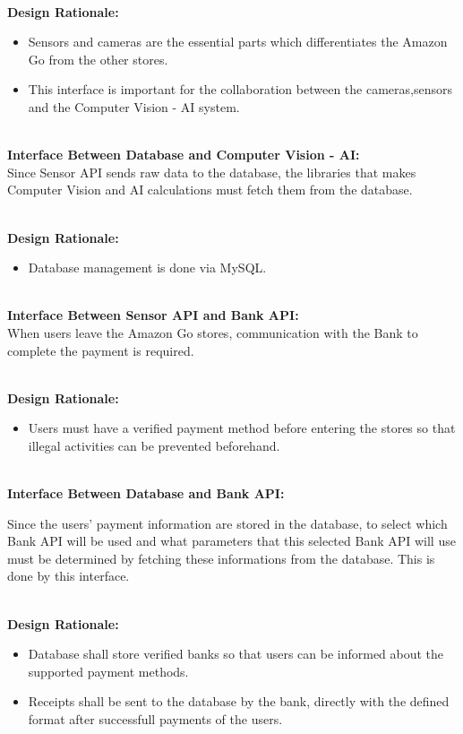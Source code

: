 \documentclass[11pt]{article}
\begin{document}
    \textbf{\\Design Rationale:}
    \begin{itemize}
        \item Sensors and cameras are the essential parts which differentiates the Amazon Go from the other stores.  
        \item This interface is important for the collaboration between the cameras,sensors and the Computer Vision - AI system.
    \end{itemize}

    \textbf{\\Interface Between Database and Computer Vision - AI:\\}
        Since Sensor API sends raw data to the database, the libraries that makes Computer Vision and AI calculations must fetch them from the database.    

    \textbf{\\Design Rationale:}
    \begin{itemize}
       \item Database management is done via MySQL.
    \end{itemize}

    \textbf{\\Interface Between Sensor API and Bank API:\\}
        When users leave the Amazon Go stores, communication with the Bank to complete the payment is required.
    
    \textbf{\\Design Rationale:}
    \begin{itemize}
       \item Users must have a verified payment method before entering the stores so that illegal activities can be prevented beforehand.
    \end{itemize}

    \textbf{\\Interface Between Database and Bank API:\\}
    
       Since the users' payment information are stored in the database, to select which Bank API will be used and what parameters that this selected Bank API will use must be 
       determined by fetching these informations from the database. This is done by this interface.

    
    \textbf{\\Design Rationale:}
    \begin{itemize}
       \item Database shall store verified banks so that users can be informed about the supported payment methods.
       \item Receipts shall be sent to the database by the bank, directly with the defined format after successfull payments of the users.
    \end{itemize}
\end{document}
